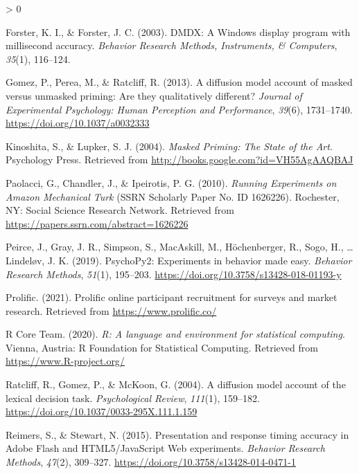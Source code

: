 \documentclass[
  english,
  man]{apa6}
\newlength{\cslhangindent}
\newenvironment{CSLReferences}[2] %
 {%
  \setlength{\parindent}{0pt}
  \ifodd #1 \everypar{\setlength{\hangindent}{\cslhangindent}}\ignorespaces\fi
  \ifnum #2 > 0
  \setlength{\parskip}{#2\baselineskip}
  \fi
 }%
 {}
\begin{document}
\begin{CSLReferences}{1}{0}
\leavevmode\hypertarget{ref-forsterDMDXWindowsDisplay2003}{}%
Forster, K. I., \& Forster, J. C. (2003). {DMDX}: {A Windows} display program with millisecond accuracy. \emph{Behavior Research Methods, Instruments, \& Computers}, \emph{35}(1), 116--124.

\leavevmode\hypertarget{ref-gomezDiffusionModelAccount2013}{}%
Gomez, P., Perea, M., \& Ratcliff, R. (2013). A diffusion model account of masked versus unmasked priming: {Are} they qualitatively different? \emph{Journal of Experimental Psychology: Human Perception and Performance}, \emph{39}(6), 1731--1740. \url{https://doi.org/10.1037/a0032333}

\leavevmode\hypertarget{ref-kinoshitaMaskedPrimingState2004}{}%
Kinoshita, S., \& Lupker, S. J. (2004). \emph{Masked {Priming}: {The State} of the {Art}}. {Psychology Press}. Retrieved from \url{http://books.google.com?id=VH55AgAAQBAJ}

\leavevmode\hypertarget{ref-paolacciRunningExperimentsAmazon2010}{}%
Paolacci, G., Chandler, J., \& Ipeirotis, P. G. (2010). \emph{Running {Experiments} on {Amazon Mechanical Turk}} (SSRN Scholarly Paper No. ID 1626226). {Rochester, NY}: {Social Science Research Network}. Retrieved from \url{https://papers.ssrn.com/abstract=1626226}

\leavevmode\hypertarget{ref-peirce2019}{}%
Peirce, J., Gray, J. R., Simpson, S., MacAskill, M., Höchenberger, R., Sogo, H., \ldots{} Lindeløv, J. K. (2019). PsychoPy2: Experiments in behavior made easy. \emph{Behavior Research Methods}, \emph{51}(1), 195--203. \url{https://doi.org/10.3758/s13428-018-01193-y}

\leavevmode\hypertarget{ref-prolific2021}{}%
Prolific. (2021). Prolific \textbar{} online participant recruitment for surveys and market research. Retrieved from \url{https://www.prolific.co/}

\leavevmode\hypertarget{ref-R-base}{}%
R Core Team. (2020). \emph{R: A language and environment for statistical computing}. Vienna, Austria: R Foundation for Statistical Computing. Retrieved from \url{https://www.R-project.org/}

\leavevmode\hypertarget{ref-ratcliff2004}{}%
Ratcliff, R., Gomez, P., \& McKoon, G. (2004). A diffusion model account of the lexical decision task. \emph{Psychological Review}, \emph{111}(1), 159--182. \url{https://doi.org/10.1037/0033-295X.111.1.159}

\leavevmode\hypertarget{ref-reimersPresentationResponseTiming2015}{}%
Reimers, S., \& Stewart, N. (2015). Presentation and response timing accuracy in {Adobe Flash} and {HTML5}/{JavaScript Web} experiments. \emph{Behavior Research Methods}, \emph{47}(2), 309--327. \url{https://doi.org/10.3758/s13428-014-0471-1}


\end{CSLReferences}
\end{document}

